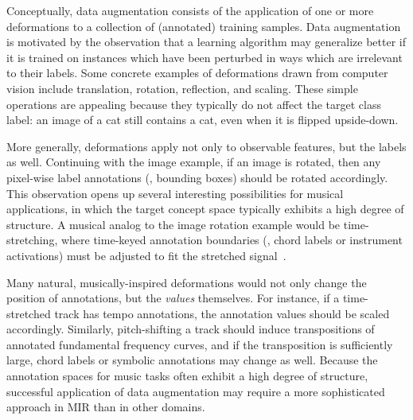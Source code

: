 \documentclass{article}
\begin{document}
Conceptually, data augmentation consists of the application of one or more deformations to
a collection of (annotated) training samples.
Data augmentation is motivated by the observation that a learning algorithm may
generalize better if it is trained on instances which have been perturbed in ways 
which are irrelevant to their labels.
Some concrete examples of deformations drawn from computer vision include translation,
rotation, reflection, and scaling.
These simple operations are appealing because they typically do not affect the target 
class label: an image of a cat still contains a cat, even when it is flipped upside-down.

More generally, deformations apply not only to observable features, but the labels as well.
Continuing with the image example, if an image is rotated, 
then any pixel-wise label annotations (\eg, bounding boxes) should be rotated accordingly.
This observation opens up several interesting possibilities for musical applications, in
which the target concept space typically exhibits a high degree of structure.
A musical analog to the image rotation example would be time-stretching,
where time-keyed annotation boundaries (\eg, chord labels or instrument
activations) must be adjusted to fit the stretched signal~\cite{mauch2013audio}.

Many natural, musically-inspired deformations would not only change the position of
annotations, but the \emph{values} themselves.
For instance, if a time-stretched track has tempo annotations, the annotation values
should be scaled accordingly.
Similarly, pitch-shifting a track should induce transpositions of annotated fundamental
frequency curves, and if the transposition is sufficiently large, chord labels or symbolic 
annotations may change as well.
Because the annotation spaces for music tasks often exhibit a high degree of structure,
successful application of data augmentation may require a more sophisticated approach in MIR
than in other domains.
\end{document}
